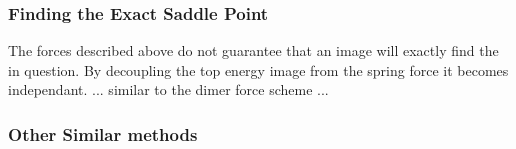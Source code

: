 \subsubsection{Finding the Exact Saddle Point}
The forces described above do not guarantee that an image will exactly find the  in question.
By decoupling the top energy image from the spring force it becomes independant.
... similar to the dimer force scheme ...

\subsubsection{Other Similar methods}

\incomplete
